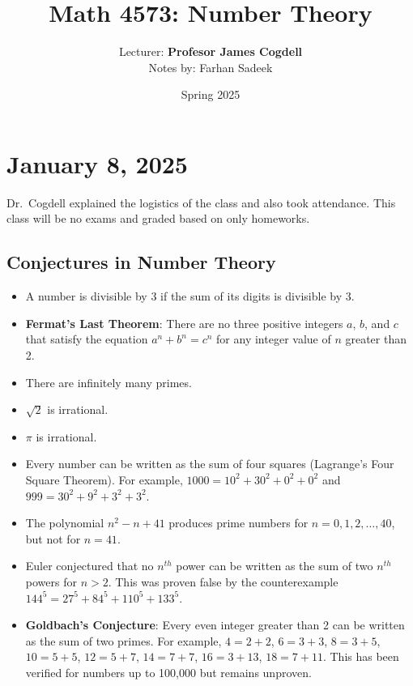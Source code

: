 \documentclass[11pt]{article}
\title{Math 4573: Number Theory}
\author{Lecturer: \textbf{Profesor James Cogdell}\\Notes by: Farhan Sadeek}
\date{Spring 2025}
\begin{document}
\maketitle

\section{January 8, 2025}

Dr.\ Cogdell explained the logistics of the class and also took attendance.
This class will be no exams and graded based on only homeworks.

\subsection{Conjectures in Number Theory}
\begin{itemize}
    \item A number is divisible by 3 if the sum of its digits is divisible by 3.
    \item \textbf{Fermat's Last Theorem}: There are no three positive integers $a$, $b$, and $c$ that satisfy the equation $a^n + b^n = c^n$ for any integer value of $n$ greater than 2.
    \item There are infinitely many primes.
    \item $\sqrt{2}$ is irrational.
    \item $\pi$ is irrational.
    \item Every number can be written as the sum of four squares (Lagrange's Four Square
          Theorem). For example, $1000 = 10^2 + 30^2 + 0^2 + 0^2$ and $999 = 30^2 + 9^2 +
              3^2 + 3^2$.
    \item The polynomial $n^2 - n + 41$ produces prime numbers for $n = 0, 1, 2, \ldots,
              40$, but not for $n = 41$.
    \item Euler conjectured that no $n^{th}$ power can be written as the sum of two
          $n^{th}$ powers for $n > 2$. This was proven false by the counterexample $144^5
              = 27^5 + 84^5 + 110^5 + 133^5$.
    \item \textbf{Goldbach's Conjecture}: Every even integer greater than 2 can be written as the sum of two primes. For example, $4 = 2 + 2$, $6 = 3 + 3$, $8 = 3 + 5$, $10 = 5 + 5$, $12 = 5 + 7$, $14 = 7 + 7$, $16 = 3 + 13$, $18 = 7 + 11$. This has been verified for numbers up to 100,000 but remains unproven.
\end{itemize}
\end{document}

